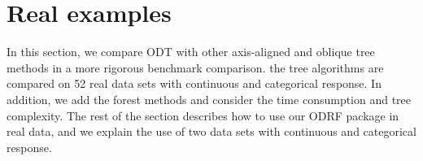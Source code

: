 \documentclass[nojss]{jss}
\numberwithin{equation}{section}
\begin{document}
\section{Real examples} \label{sec:examples}
In this section, we compare ODT with other axis-aligned and oblique tree methods in a more rigorous benchmark comparison. the tree algorithms are compared on 52 real data sets with continuous and categorical response. In addition, we add the forest methods and consider the time consumption and tree complexity. The rest of the section describes how to use our ODRF package in real data, and we explain the use of two data sets with continuous and categorical response.
\end{document}
